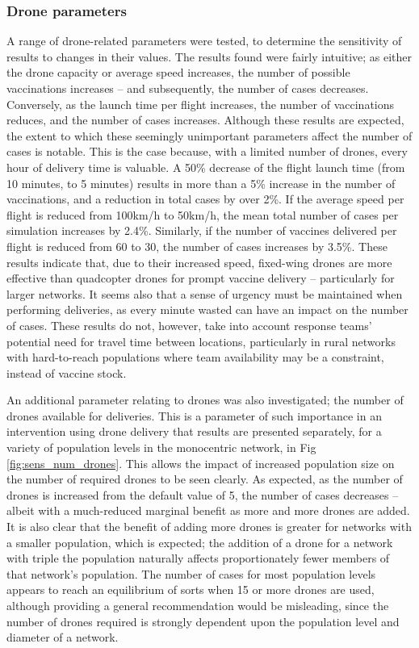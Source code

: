 \documentclass[10pt,letterpaper]{article}
\begin{document}
\subsubsection*{Drone parameters}
A range of drone-related parameters were tested, to determine the sensitivity of results to changes in their values. The results found were fairly intuitive; as either the drone capacity or average speed increases, the number of possible vaccinations increases -- and subsequently, the number of cases decreases. Conversely, as the launch time per flight increases, the number of vaccinations reduces, and the number of cases increases. Although these results are expected, the extent to which these seemingly unimportant parameters affect the number of cases is notable. This is the case because, with a limited number of drones, every hour of delivery time is valuable. A 50\% decrease of the flight launch time (from 10 minutes, to 5 minutes) results in more than a 5\% increase in the number of vaccinations, and a reduction in total cases by over 2\%. If the average speed per flight is reduced from 100km/h to 50km/h, the mean total number of cases per simulation increases by 2.4\%. Similarly, if the number of vaccines delivered per flight is reduced from 60 to 30, the number of cases increases by 3.5\%. These results indicate that, due to their increased speed, fixed-wing drones are more effective than quadcopter drones for prompt vaccine delivery -- particularly for larger networks. It seems also that a sense of urgency must be maintained when performing deliveries, as every minute wasted can have an impact on the number of cases. These results do not, however, take into account response teams' potential need for travel time between locations, particularly in rural networks with hard-to-reach populations where team availability may be a constraint, instead of vaccine stock.

An additional parameter relating to drones was also investigated; the number of drones available for deliveries. This is a parameter of such importance in an intervention using drone delivery that results are presented separately, for a variety of population levels in the monocentric network, in Fig \ref{fig:sens_num_drones}. This allows the impact of increased population size on the number of required drones to be seen clearly. 
As expected, as the number of drones is increased from the default value of 5, the number of cases decreases -- albeit with a much-reduced marginal benefit as more and more drones are added. It is also clear that the benefit of adding more drones is greater for networks with a smaller population, which is expected; the addition of a drone for a network with triple the population naturally affects proportionately fewer members of that network's population. The number of cases for most population levels appears to reach an equilibrium of sorts when 15 or more drones are used, although providing a general recommendation would be misleading, since the number of drones required is strongly dependent upon the population level and diameter of a network.
\end{document}
